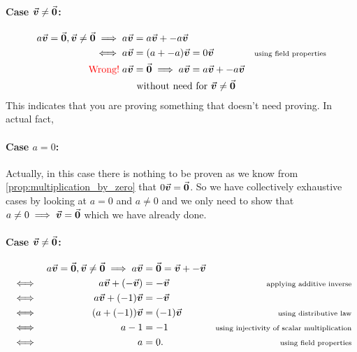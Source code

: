 \documentclass[MathsNotesBase.tex]{subfiles}
\begin{document}
		\paragraph{Case $\vec{\bm{v}} \neq \vec{\bm{0}}$:}
		\begin{align*}	 	
	 	a\v = \0, \v \neq \0 \implies a\v &=a\v + -a\v &\\
	 	\iff a\v &= (a + -a)\v = 0\v &\sidecomment{using field properties} \\
	 	\wrong\; a\v &= \0 \implies  a\v =a\v + -a\v &\\
	 	&\text{ without need for } \v \neq \0 &\\
	 	\end{align*}
		This indicates that you are proving something that doesn't need proving. In actual fact,
		\paragraph{Case $a = 0$:}
		Actually, in this case there is nothing to be proven as we know from \autoref{prop:multiplication_by_zero} that $0\vec{\bm{v}} = \vec{\bm{0}}$. So we have collectively exhaustive cases by looking at $a = 0$ and $a \neq 0$ and we only need to show that $a \neq 0 \implies \vec{\bm{v}} = \vec{\bm{0}}$ which we have already done.
		\paragraph{Case $\vec{\bm{v}} \neq \vec{\bm{0}}$:}
		\begin{align*}	 	
		&& a\vec{\bm{v}} = \vec{\bm{0}}, \vec{\bm{v}} \neq \vec{\bm{0}} \implies a\vec{\bm{v}} &= \vec{\bm{0}} = \vec{\bm{v}} + -\vec{\bm{v}} &\\
		&\iff & a\vec{\bm{v}} + (-\vec{\bm{v}}) &= -\vec{\bm{v}} &\text{\scriptsize{applying additive inverse}} \\
		&\iff & a\vec{\bm{v}} + (-1)\vec{\bm{v}} &= -\vec{\bm{v}} &\text{\scriptsize{}} \\
		&\iff & (a + (-1))\vec{\bm{v}} &= (-1)\vec{\bm{v}} &\text{\scriptsize{using distributive law}} \\
		&\iff & a - 1 &= -1 &\text{\scriptsize{using injectivity of scalar multiplication}} \\
		&\iff & a &= 0. &\text{\scriptsize{using field properties}} \\
		\end{align*}

	
\end{document}
